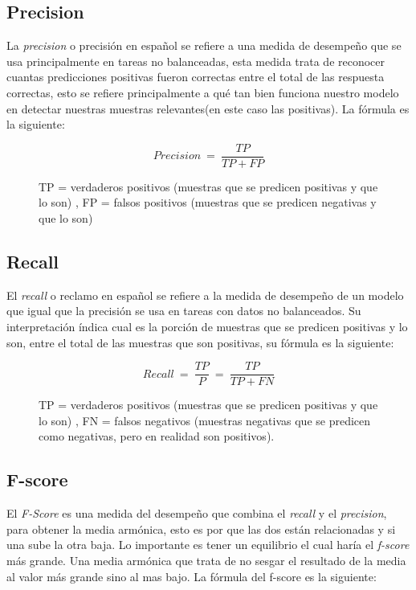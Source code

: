 \subsection{Precision}

\par La \textit{precision} o precisión en español se refiere a una medida de desempeño que se usa principalmente en tareas no balanceadas, esta medida trata de reconocer cuantas predicciones positivas fueron correctas entre el total de las respuesta correctas, esto se refiere principalmente a qué tan bien funciona nuestro modelo en detectar nuestras muestras relevantes(en este caso las positivas). La fórmula es la siguiente:
\begin{figure}[H]
	\centering
	\begin{equation*}
		Precision\ =\ \frac{TP}{TP+FP}
	\end{equation*}
	\caption*{TP = verdaderos positivos (muestras que se predicen positivas y que lo son) , FP = falsos positivos (muestras que se predicen negativas y que lo son)}
\end{figure}


\subsection{Recall}

\par El \textit{recall} o reclamo en español se refiere a la medida de desempeño de un modelo que igual que la precisión se usa en tareas con datos no balanceados. Su interpretación índica cual es la porción de muestras que se predicen positivas y lo son, entre el total de las muestras que son positivas, su fórmula es la siguiente:

\begin{figure}[H]
	\centering
	\begin{equation*}
		Recall\ =\ \frac{TP}{P}\ =\ \frac{TP}{TP+FN}
	\end{equation*}
	\caption*{TP = verdaderos positivos (muestras que se predicen positivas y que lo son) , FN = falsos negativos (muestras negativas que se predicen como negativas, pero en realidad son positivos).}
\end{figure}

\subsection{F-score}

\par El \textit{F-Score} es una medida del desempeño que combina el \textit{recall} y el \textit{precision}, para obtener la media armónica, esto es por que las dos están relacionadas y si una sube la otra baja. Lo importante es tener un equilibrio el cual haría el \textit{f-score} más grande. Una media armónica que trata de no sesgar el resultado de la media al valor más grande sino al mas bajo. La fórmula del f-score es la siguiente:


